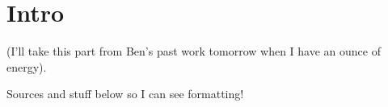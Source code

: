\documentclass[aasms,12pt]{article}
\begin{document}
\section{Intro}
(I'll take this part from Ben's past work tomorrow when I have an ounce of energy).




Sources and stuff below so I can see formatting!


\nocite{*}

\begingroup
\renewcommand{\section}[2]{}%
\begin{footnotesize}

\end{footnotesize}
\endgroup
\end{document}
